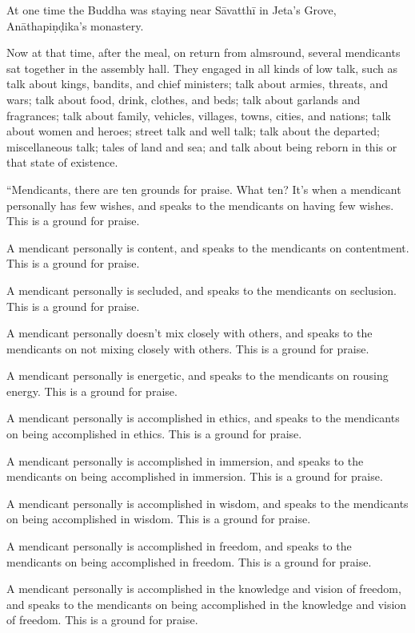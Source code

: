 \documentclass[12pt,openany]{book}%
\begin{document}
At one time the Buddha was staying near \textsanskrit{Sāvatthī} in Jeta’s Grove, \textsanskrit{Anāthapiṇḍika}’s monastery. 

Now at that time, after the meal, on return from almsround, several mendicants sat together in the assembly hall. They engaged in all kinds of low talk, such as talk about kings, bandits, and chief ministers; talk about armies, threats, and wars; talk about food, drink, clothes, and beds; talk about garlands and fragrances; talk about family, vehicles, villages, towns, cities, and nations; talk about women and heroes; street talk and well talk; talk about the departed; miscellaneous talk; tales of land and sea; and talk about being reborn in this or that state of existence. 

“Mendicants, there are ten grounds for praise. What ten? It’s when a mendicant personally has few wishes, and speaks to the mendicants on having few wishes. This is a ground for praise. 

A mendicant personally is content, and speaks to the mendicants on contentment. This is a ground for praise. 

A mendicant personally is secluded, and speaks to the mendicants on seclusion. This is a ground for praise. 

A mendicant personally doesn’t mix closely with others, and speaks to the mendicants on not mixing closely with others. This is a ground for praise. 

A mendicant personally is energetic, and speaks to the mendicants on rousing energy. This is a ground for praise. 

A mendicant personally is accomplished in ethics, and speaks to the mendicants on being accomplished in ethics. This is a ground for praise. 

A mendicant personally is accomplished in immersion, and speaks to the mendicants on being accomplished in immersion. This is a ground for praise. 

A mendicant personally is accomplished in wisdom, and speaks to the mendicants on being accomplished in wisdom. This is a ground for praise. 

A mendicant personally is accomplished in freedom, and speaks to the mendicants on being accomplished in freedom. This is a ground for praise. 

A mendicant personally is accomplished in the knowledge and vision of freedom, and speaks to the mendicants on being accomplished in the knowledge and vision of freedom. This is a ground for praise. 
\end{document}
